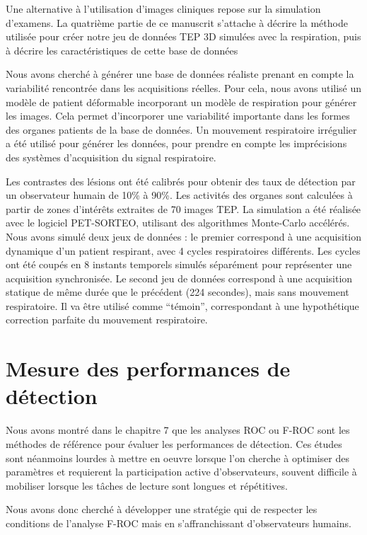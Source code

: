 Une alternative à l’utilisation d’images cliniques repose sur la simulation d’examens. La quatrième partie de ce manuscrit s'attache à décrire la méthode utilisée pour créer notre jeu de données TEP 3D simulées avec la respiration, puis à décrire les caractéristiques de cette base de données

Nous avons cherché à générer une base de données réaliste prenant en compte la variabilité rencontrée dans les acquisitions réelles. Pour cela, nous avons utilisé un modèle de patient déformable incorporant un modèle de respiration pour générer les images. Cela permet d'incorporer une variabilité importante dans les formes des organes patients de la base de données. Un mouvement respiratoire irrégulier a été utilisé pour générer les données, pour prendre en compte les imprécisions des systèmes d'acquisition du signal respiratoire. 


Les contrastes des lésions ont été calibrés pour obtenir des taux de détection par un observateur humain de 10\% à 90\%. Les activités des organes sont calculées à partir de zones d'intérêts extraites de 70 images TEP. La simulation a été réalisée avec le logiciel PET-SORTEO, utilisant des algorithmes Monte-Carlo accélérés. Nous avons simulé deux jeux de données : le premier correspond à une acquisition dynamique d'un patient respirant, avec 4 cycles respiratoires différents. Les cycles ont été coupés en 8 instants temporels simulés séparément pour représenter une acquisition synchronisée. Le second jeu de données correspond à une acquisition statique de même durée que le précédent (224 secondes), mais sans mouvement respiratoire. Il va être utilisé comme ``témoin'', correspondant à une hypothétique correction parfaite du mouvement respiratoire.


\section{Mesure des performances de détection}

Nous avons montré dans le chapitre 7 que les analyses ROC ou F-ROC sont les méthodes de référence pour évaluer les performances de détection. Ces études sont néanmoins lourdes à mettre en oeuvre lorsque l'on cherche à optimiser des paramètres et requierent la participation active d'observateurs, souvent difficile à mobiliser lorsque les tâches de lecture sont longues et répétitives.

Nous avons donc cherché à développer une stratégie qui  de respecter les conditions de l'analyse F-ROC mais en s'affranchissant d'observateurs humains.

